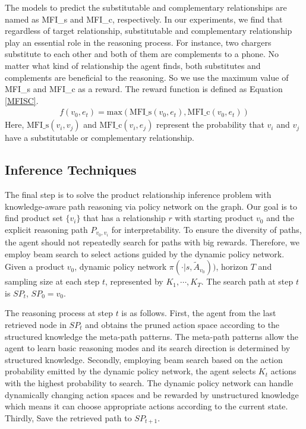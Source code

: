 \documentclass[review]{elsarticle}
\begin{document}
\begin{sloppypar}
The models to predict the substitutable and complementary relationships are named as MFI\_s and MFI\_c, respectively.
In our experiments, we find that regardless of target relationship, substitutable and complementary relationship play an essential role in the reasoning process. 
For instance, two chargers substitute to each other and both of them are complements to a phone. 
No matter what kind of relationship the agent finds, both substitutes and complements are beneficial to the reasoning. 
So we use the maximum value of MFI\_s and MFI\_c as a reward.
The reward function is defined as Equation \ref{MFISC}.
\begin{equation}\label{MFISC}
\begin{aligned}
f(v_{0},e_{t})=\text{max}(\text{MFI}\_\text{s}(v_{0},e_{t}),\text{MFI}\_\text{c}(v_{0},e_{t}))
\end{aligned}
\end{equation}
Here, $\text{MFI}\_\text{s}(v_{i},v_{j})$ and $\text{MFI}\_\text{c}(v_{i},e_{j})$ represent the probability that $v_{i}$ and $v_{j}$ have a substitutable or complementary relationship.
\subsection{Inference Techniques}
\label{inference}
The final step is to solve the product relationship inference problem with knowledge-aware path reasoning via policy network on the graph. 
Our goal is to find product set $\{v_{i}\}$ that has a relationship $r$ with starting product $v_{0}$ and the explicit reasoning path $P_{v_{0},v_{i}}$ for interpretability.
To ensure the diversity of paths, the agent should not repeatedly search for paths with big rewards. 
Therefore, we employ beam search to select actions guided by the dynamic policy network.
Given a product $v_{0}$, dynamic policy network $\pi(\cdot|s,\tilde{A}_{v_{0}}))$, horizon $T$ and sampling size at each step $t$, represented by $K_{1},\cdots,K_{T}$. The search path at step $t$ is $SP_{t}$, $SP_{0}=v_{0}$.

The reasoning process at step $t$ is as follows.
First, the agent from the last retrieved node in $SP_{t}$ and obtains the pruned action space according to the structured knowledge the meta-path patterns.
The meta-path patterns allow the agent to learn basic reasoning modes and its search direction is determined by structured knowledge.
Secondly, employing beam search based on the action probability emitted by the dynamic policy network, the agent selects $K_{t}$ actions with the highest probability to search.
The dynamic policy network can handle dynamically changing action spaces and be rewarded by unstructured knowledge which means it can choose appropriate actions according to the current state.
Thirdly, Save the retrieved path to $SP_{t+1}$.


\end{sloppypar}
\end{document}
